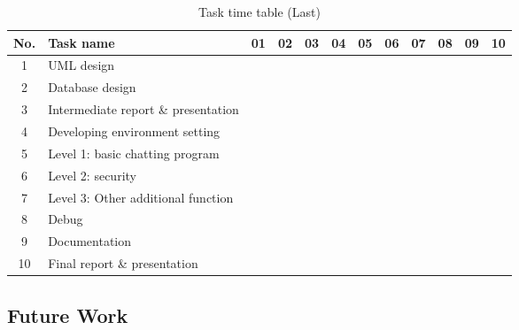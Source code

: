 \documentclass[a4paper,11pt]{article}
\begin{document}
\begin{table}[h]
\centering
\caption{Task time table (Last)}
\label{my-label}
\begin{tabular}{|c|l||c|c|c|c|c|c|c|c|c|c|}
\hline
\rowcolor{No}
No. & Task name & 01 & 02 & 03 & 04 & 05 & 06 & 07 & 08 & 09 & 10 \\ \hline \hline
1 & UML design & \cellcolor{UML} & \cellcolor{UML} &  &  &  &  &  &  &  &  \\ \hline
2 & Database design & \cellcolor{Data} & \cellcolor{Data} &  &  &  &  &  &  &  &  \\ \hline
3 & Intermediate report \& presentation &  & \cellcolor{intermediate} & \cellcolor{intermediate} &  &  &  &  &  &  &  \\ \hline
4 & Developing environment setting &  &  & \cellcolor{environ} & \cellcolor{environ} &  &  &  &  &  &  \\ \hline
5 & Level 1: basic chatting program &  &  & \cellcolor{level1} & \cellcolor{level1} & \cellcolor{level1} &  &  &  &  &  \\ \hline
6 & Level 2: security &  &  &  &  & \cellcolor{level2} & \cellcolor{level2} & \cellcolor{level2} &  &  &  \\ \hline
7 & Level 3: Other additional function &  &  &  &  &  &  & \cellcolor{level3} & \cellcolor{level3} & \cellcolor{level3} &  \\ \hline
8 & Debug &  &  &  &  & \cellcolor{debug} & \cellcolor{debug} & \cellcolor{debug} & \cellcolor{debug} & \cellcolor{debug} & \cellcolor{debug} \\ \hline
9 & Documentation &  &  &  &  & \cellcolor{documentation} &  & \cellcolor{documentation} &  & \cellcolor{documentation} &  \\ \hline
10 & Final report \& presentation &  &  &  &  &  &  &  &  & \cellcolor{final} & \cellcolor{final} \\ \hline
\end{tabular}
\end{table}



\subsection{Future Work}
\end{document}
